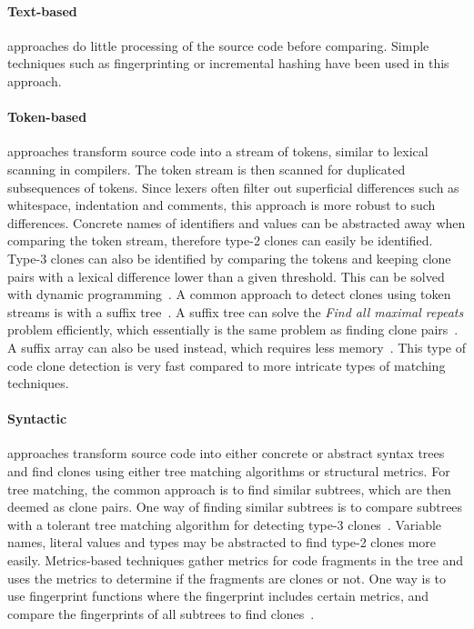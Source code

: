 \paragraph{Text-based} approaches do little processing of the source code before
comparing. Simple techniques such as fingerprinting or incremental hashing have been used
in this approach. 

\paragraph{Token-based} approaches transform source code into a stream of tokens, similar
to lexical scanning in compilers. The token stream is then scanned for duplicated
subsequences of tokens. Since lexers often filter out superficial differences such as
whitespace, indentation and comments, this approach is more robust to such differences.
Concrete names of identifiers and values can be abstracted away when comparing the token
stream, therefore type-2 clones can easily be identified. Type-3 clones can also be
identified by comparing the tokens and keeping clone pairs with a lexical difference lower
than a given threshold. This can be solved with dynamic
programming~\cite{BakerSparseDynamicProgramming}. A common approach to detect clones using
token streams is with a suffix tree~\cite{Bakerdup}. A suffix tree can solve the
\textit{Find all maximal repeats} problem efficiently, which essentially is the same
problem as finding clone pairs~\cite[143]{AlgorithmsOnStringsTreesSequences}. A suffix
array can also be used instead, which requires less
memory~\cite{ReplaceSuffixTreeWithEnchancedSuffixArray}. This type of code clone detection
is very fast compared to more intricate types of matching techniques.

\paragraph{Syntactic} approaches transform source code into either concrete or abstract
syntax trees and find clones using either tree matching algorithms or structural metrics.
For tree matching, the common approach is to find similar subtrees, which are then deemed
as clone pairs. One way of finding similar subtrees is to compare subtrees with a tolerant
tree matching algorithm for detecting type-3 clones~\cite{ASTCloneDetection}. Variable
names, literal values and types may be abstracted to find type-2 clones more easily.
Metrics-based techniques gather metrics for code fragments in the tree and uses the
metrics to determine if the fragments are clones or not. One way is to use fingerprint
functions where the fingerprint includes certain metrics, and compare the fingerprints of
all subtrees to find clones~\cite{Deckard}.

